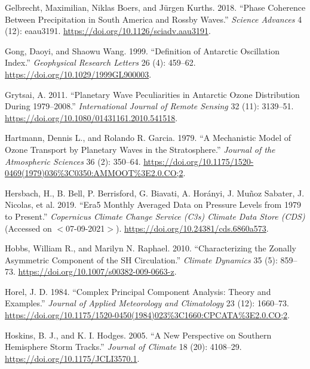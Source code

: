 \documentclass[smallextended]{svjour3}       %
\newlength{\cslhangindent}
\newlength{\cslentryspacingunit} %
\newenvironment{CSLReferences}[2] %
 {%
  \setlength{\parindent}{0pt}
  \ifodd #1
  \let\oldpar\par
  \def\par{\hangindent=\cslhangindent\oldpar}
  \fi
  \setlength{\parskip}{#2\cslentryspacingunit}
 }%
 {}
\begin{document}
\begin{CSLReferences}{1}{0}
\leavevmode{}%
Gelbrecht, Maximilian, Niklas Boers, and Jürgen Kurths. 2018. {``Phase Coherence Between Precipitation in {South America} and {Rossby} Waves.''} \emph{Science Advances} 4 (12): eaau3191. \url{https://doi.org/10.1126/sciadv.aau3191}.

\leavevmode{}%
Gong, Daoyi, and Shaowu Wang. 1999. {``Definition of {Antarctic Oscillation} Index.''} \emph{Geophysical Research Letters} 26 (4): 459--62. \url{https://doi.org/10.1029/1999GL900003}.

\leavevmode{}%
Grytsai, A. 2011. {``Planetary Wave Peculiarities in {Antarctic} Ozone Distribution During 1979--2008.''} \emph{International Journal of Remote Sensing} 32 (11): 3139--51. \url{https://doi.org/10.1080/01431161.2010.541518}.

\leavevmode{}%
Hartmann, Dennis L., and Rolando R. Garcia. 1979. {``A {Mechanistic Model} of {Ozone Transport} by {Planetary Waves} in the {Stratosphere}.''} \emph{Journal of the Atmospheric Sciences} 36 (2): 350--64. \url{https://doi.org/10.1175/1520-0469(1979)036\%3C0350:AMMOOT\%3E2.0.CO;2}.

\leavevmode{}%
Hersbach, H., B. Bell, P. Berrisford, G. Biavati, A. Horányi, J. Muñoz Sabater, J. Nicolas, et al. 2019. {``{Era5} Monthly Averaged Data on Pressure Levels from 1979 to Present.''} \emph{{Copernicus Climate Change Service} ({C3s}) {Climate Data Store} ({CDS})} (Accessed on {\(<\)}07-09-2021{\(>\)}). \url{https://doi.org/10.24381/cds.6860a573}.

\leavevmode{}%
Hobbs, William R., and Marilyn N. Raphael. 2010. {``Characterizing the Zonally Asymmetric Component of the {SH} Circulation.''} \emph{Climate Dynamics} 35 (5): 859--73. \url{https://doi.org/10.1007/s00382-009-0663-z}.

\leavevmode{}%
Horel, J. D. 1984. {``Complex {Principal Component Analysis}: {Theory} and {Examples}.''} \emph{Journal of Applied Meteorology and Climatology} 23 (12): 1660--73. \url{https://doi.org/10.1175/1520-0450(1984)023\%3C1660:CPCATA\%3E2.0.CO;2}.

\leavevmode{}%
Hoskins, B. J., and K. I. Hodges. 2005. {``A {New Perspective} on {Southern Hemisphere Storm Tracks}.''} \emph{Journal of Climate} 18 (20): 4108--29. \url{https://doi.org/10.1175/JCLI3570.1}.


\end{CSLReferences}
\end{document}
